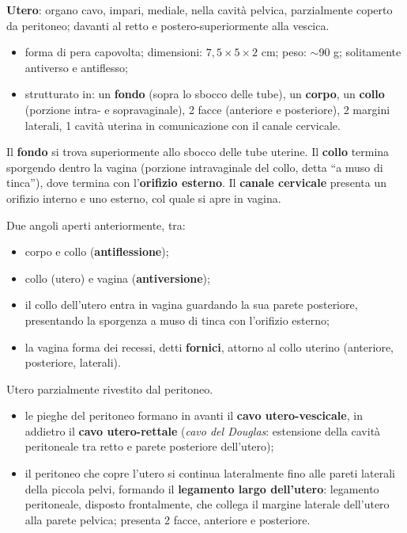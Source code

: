 \textbf{Utero}: organo cavo, impari, mediale, nella cavità pelvica, parzialmente coperto da
peritoneo; davanti al retto e postero-superiormente alla vescica.
\begin{itemize}
  \item forma di pera capovolta; dimensioni: $7{,}5 \times 5 \times 2$ cm; peso: $\sim$90 g;
    solitamente antiverso e antiflesso;
  \item strutturato in: un \textbf{fondo} (sopra lo sbocco delle tube), un \textbf{corpo}, un
    \textbf{collo} (porzione intra- e sopravaginale), 2 facce (anteriore e posteriore), 2 margini
    laterali, 1 cavità uterina in comunicazione con il canale cervicale.
\end{itemize}

Il \textbf{fondo} si trova superiormente allo sbocco delle tube uterine. Il \textbf{collo}
termina sporgendo dentro la vagina (porzione intravaginale del collo, detta ``a muso di
tinca''), dove termina con l'\textbf{orifizio esterno}. Il \textbf{canale cervicale} presenta un
orifizio interno e uno esterno, col quale si apre in vagina.

Due angoli aperti anteriormente, tra:
\begin{itemize}
  \item corpo e collo (\textbf{antiflessione});
  \item collo (utero) e vagina (\textbf{antiversione});
  \item il collo dell'utero entra in vagina guardando la sua parete posteriore, presentando la
    sporgenza a muso di tinca con l'orifizio esterno;
  \item la vagina forma dei recessi, detti \textbf{fornici}, attorno al collo uterino (anteriore,
    posteriore, laterali).
\end{itemize}

Utero parzialmente rivestito dal peritoneo.
\begin{itemize}
  \item le pieghe del peritoneo formano in avanti il \textbf{cavo utero-vescicale}, in addietro il
    \textbf{cavo utero-rettale} (\textit{cavo del Douglas}: estensione della cavità peritoneale tra
    retto e parete posteriore dell'utero);
  \item il peritoneo che copre l'utero si continua lateralmente fino alle pareti laterali della
    piccola pelvi, formando il \textbf{legamento largo dell'utero}: legamento peritoneale,
    disposto frontalmente, che collega il margine laterale dell'utero alla parete pelvica; presenta
    2 facce, anteriore e posteriore.
\end{itemize}

